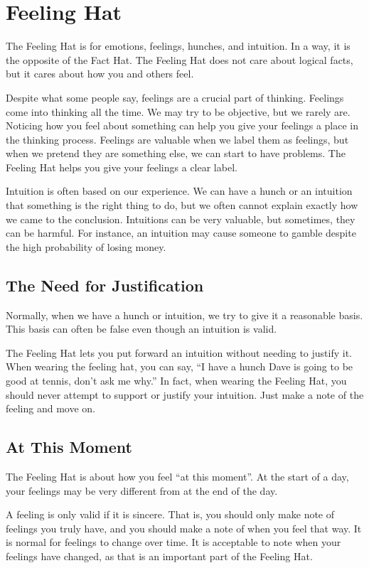\section*{Feeling Hat}

The Feeling Hat is for emotions, feelings, hunches, and intuition. In a way, it is the opposite of the Fact Hat. The Feeling Hat does not care about logical facts, but it cares about how you and others feel. 

Despite what some people say, feelings are a crucial part of thinking. Feelings come into thinking all the time. We may try to be objective, but we rarely are. Noticing how you feel about something can help you give your feelings a place in the thinking process. Feelings are valuable when we label them as feelings, but when we pretend they are something else, we can start to have problems. The Feeling Hat helps you give your feelings a clear label.

Intuition is often based on our experience. We can have a hunch or an intuition that something is the right thing to do, but we often cannot explain exactly how we came to the conclusion. Intuitions can be very valuable, but sometimes, they can be harmful. For instance, an intuition may cause someone to gamble despite the high probability of losing money.

\subsection*{The Need for Justification}
Normally, when we have a hunch or intuition, we try to give it a reasonable basis. This basis can often be false even though an intuition is valid.

The Feeling Hat lets you put forward an intuition without needing to justify it. When wearing the feeling hat, you can say, ``I have a hunch Dave is going to be good at tennis, don't ask me why.''
In fact, when wearing the Feeling Hat, you should never attempt to support or justify your intuition. Just make a note of the feeling and move on.

\subsection*{At This Moment}
The Feeling Hat is about how you feel ``at this moment''. At the start of a day, your feelings may be very different from at the end of the day.

A feeling is only valid if it is sincere. That is, you should only make note of feelings you truly have, and you should make a note of when you feel that way.
It is normal for feelings to change over time. It is acceptable to note when your feelings have changed, as that is an important part of the Feeling Hat.

